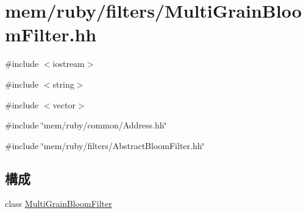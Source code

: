 \hypertarget{MultiGrainBloomFilter_8hh}{
\section{mem/ruby/filters/MultiGrainBloomFilter.hh}
\label{MultiGrainBloomFilter_8hh}
}
{\ttfamily \#include $<$iostream$>$}\par
{\ttfamily \#include $<$string$>$}\par
{\ttfamily \#include $<$vector$>$}\par
{\ttfamily \#include \char`\"{}mem/ruby/common/Address.hh\char`\"{}}\par
{\ttfamily \#include \char`\"{}mem/ruby/filters/AbstractBloomFilter.hh\char`\"{}}\par
\subsection*{構成}
\begin{DoxyCompactItemize}
\item 
class \hyperlink{classMultiGrainBloomFilter}{MultiGrainBloomFilter}
\end{DoxyCompactItemize}
